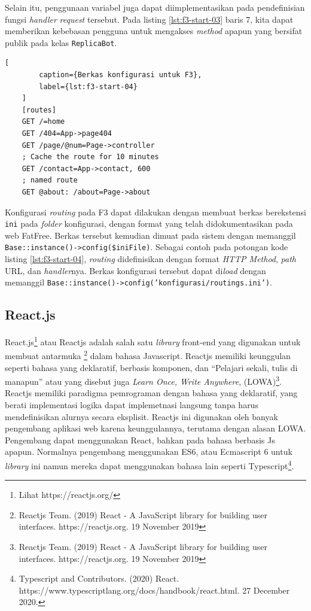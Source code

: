     Selain itu, penggunaan variabel juga dapat diimplementasikan pada
    pendefinisian fungsi \textit{handler} \textit{request} tersebut. Pada
    listing \ref{lst:f3-start-03} baris 7, kita dapat memberikan kebebasan
    pengguna untuk mengakses \textit{method} apapun yang bersifat publik pada
    kelas \texttt{ReplicaBot}.
    \begin{lstlisting}[
        caption={Berkas konfigurasi untuk F3},
        label={lst:f3-start-04}
    ]
    [routes]
    GET /=home
    GET /404=App->page404
    GET /page/@num=Page->controller
    ; Cache the route for 10 minutes
    GET /contact=App->contact, 600
    ; named route
    GET @about: /about=Page->about
    \end{lstlisting}
    Konfigurasi \textit{routing} pada F3 dapat dilakukan dengan membuat berkas
    berekstensi \texttt{ini} pada \textit{folder} konfigurasi, dengan format yang telah 
    didokumentasikan pada web FatFree. Berkas tersebut kemudian dimuat pada sistem
    dengan memanggil \texttt{Base::instance()->config(\$iniFile)}.    
    Sebagai contoh pada potongan kode listing \ref{lst:f3-start-04},
    \textit{routing} didefinisikan dengan format \textit{HTTP Method}, \textit{path} URL,
    dan \textit{handler}nya. Berkas konfigurasi tersebut dapat di\textit{load}
    dengan memanggil \texttt{Base::instance()->config('konfigurasi/routings.ini')}.
     
\subsection{React.js}
    React.js\footnote{Lihat https://reactjs.org/} atau Reactjs adalah salah satu
    \textit{library} front-end yang digunakan untuk membuat antarmuka
    \footnote{Reactjs Team. (2019) React - A JavaScript library for building
    user interfaces. https://reactjs.org. 19 November 2019 } dalam bahasa
    Javascript. Reactjs memiliki keunggulan seperti bahasa yang deklaratif,
    berbasis komponen, dan ``Pelajari sekali, tulis di manapun'' atau yang disebut
    juga \textit{Learn Once, Write Anywhere}, (LOWA)\footnote{Reactjs Team.
    (2019) React - A JavaScript library for building user interfaces.
    https://reactjs.org. 19 November 2019 }. 
    Reactjs memiliki paradigma pemrograman dengan bahasa yang deklaratif, yang berati implementasi
    logika dapat implemetnasi langsung tanpa harus mendefinisikan alurnya secara eksplisit.
    Reactjs ini digunakan oleh banyak
    pengembang aplikasi web karena keunggulannya, terutama dengan alasan LOWA.
    Pengembang dapat menggunakan React, bahkan pada bahasa berbasis Js apapun.
    Normalnya pengembang menggunakan ES6, atau Ecmascript 6 untuk
    \textit{library} ini namun mereka dapat menggunakan bahasa lain seperti
    Typescript\footnote{Typescript and Contributors. (2020) React.
    https://www.typescriptlang.org/docs/handbook/react.html. 27 December 2020.}.
        
